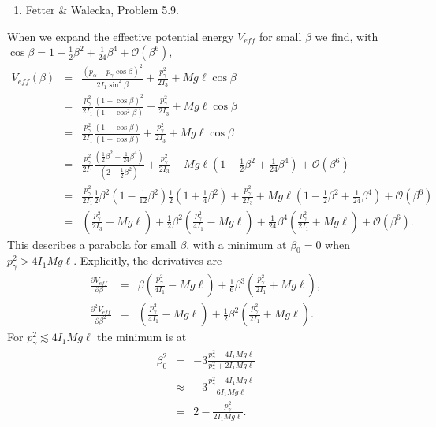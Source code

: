 \documentclass[letterpaper,11pt]{article}
\begin{document}
\begin{enumerate}[resume]
 \item Fetter \& Walecka, Problem 5.9.
\end{enumerate}
When we expand the effective potential energy $V_{eff}$ for small $\beta$ we find, with $\cos\beta = 1 - \frac{1}{2}\beta^2 + \frac{1}{24}\beta^4 + \mathcal{O}(\beta^6)$,
\begin{eqnarray*}
 V_{eff}(\beta) & = & \frac{(p_\alpha - p_\gamma\cos\beta)^2}{2 I_1 \sin^2\beta} + \frac{p^2_\gamma}{2 I_3} + Mg\ell \cos\beta \\
 & = & \frac{p_\gamma^2}{2 I_1} \frac{(1 - \cos\beta)^2}{(1 - \cos^2\beta)} + \frac{p^2_\gamma}{2 I_3} + Mg\ell \cos\beta \\
 & = & \frac{p_\gamma^2}{2 I_1} \frac{(1 - \cos\beta)}{(1 + \cos\beta)} + \frac{p^2_\gamma}{2 I_3} + Mg\ell \cos\beta \\
 & = & \frac{p_\gamma^2}{2 I_1} \frac{(\frac{1}{2}\beta^2 - \frac{1}{24}\beta^4)}{(2 - \frac{1}{2}\beta^2)} + \frac{p^2_\gamma}{2 I_3} + Mg\ell \left( 1 - \frac{1}{2}\beta^2 + \frac{1}{24}\beta^4 \right) + \mathcal{O}(\beta^6) \\
 & = & \frac{p_\gamma^2}{2 I_1} \frac{1}{2}\beta^2 (1 - \frac{1}{12}\beta^2) \frac{1}{2} (1 + \frac{1}{4}\beta^2) + \frac{p^2_\gamma}{2 I_3} + Mg\ell \left( 1 - \frac{1}{2}\beta^2 + \frac{1}{24}\beta^4 \right) + \mathcal{O}(\beta^6) \\
 & = & \left(\frac{p^2_\gamma}{2 I_3} + Mg\ell\right) + \frac{1}{2}\beta^2 \left(\frac{p^2_\gamma}{4 I_1} - Mg\ell\right) + \frac{1}{24}\beta^4 \left(\frac{p^2_\gamma}{2 I_1} + Mg\ell\right) + \mathcal{O}(\beta^6).
\end{eqnarray*}
This describes a parabola for small $\beta$, with a minimum at $\beta_0 = 0$ when $p_\gamma^2 > 4 I_1 Mg\ell$.  Explicitly, the derivatives are
\begin{eqnarray*}
 \frac{\partial V_{eff}}{\partial \beta} & = & \beta \left(\frac{p^2_\gamma}{4 I_1} - Mg\ell\right) + \frac{1}{6}\beta^3\left(\frac{p^2_\gamma}{2 I_1} + Mg\ell\right), \\
 \frac{\partial^2 V_{eff}}{\partial \beta^2} & = & \left(\frac{p^2_\gamma}{4 I_1} - Mg\ell\right) + \frac{1}{2}\beta^2\left(\frac{p^2_\gamma}{2 I_1} + Mg\ell\right).
\end{eqnarray*}
For $p_\gamma^2 \lesssim 4 I_1 Mg\ell$ the minimum is at
\begin{eqnarray*}
 \beta_0^2 & = & -3\frac{p_\gamma^2 - 4 I_1 Mg\ell}{p_\gamma^2 + 2 I_1 Mg\ell} \\
 & \approx & -3\frac{p_\gamma^2 - 4 I_1 Mg\ell}{6 I_1 Mg\ell} \\
 & = & 2 - \frac{p_\gamma^2}{2 I_1 Mg\ell}.
\end{eqnarray*}
\end{document}
